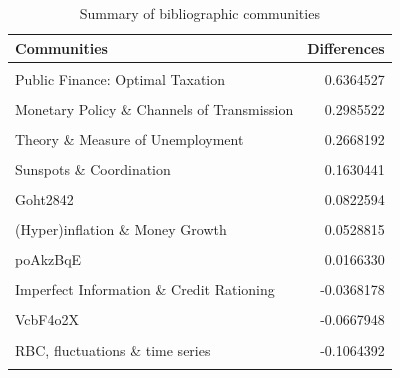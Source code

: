 \documentclass[]{elsarticle} %
\begin{document}
\begin{table}[!h]

\caption{\label{tab:summary-communities}Summary of bibliographic communities}
\centering
\fontsize{5}{7}\selectfont
\begin{threeparttable}
\begin{tabular}[t]{lr}
\toprule
Communities & Differences\\
\midrule
\cellcolor{gray!6}{Keynesian Economics, Disequilibrium, Imperfect Competition \& Contracts} & \cellcolor{gray!6}{1.4535925}\\
Public Finance: Optimal Taxation & 0.6364527\\
\cellcolor{gray!6}{Political Economy of Central Banks} & \cellcolor{gray!6}{0.3725850}\\
Monetary Policy \& Channels of Transmission & 0.2985522\\
\cellcolor{gray!6}{New Keynesian Rigidities} & \cellcolor{gray!6}{0.2672452}\\
\addlinespace
Theory \& Measure of Unemployment & 0.2668192\\
\cellcolor{gray!6}{Macro Time Series: Trends, Disturbances \& Cycles} & \cellcolor{gray!6}{0.2484878}\\
Sunspots \& Coordination & 0.1630441\\
\cellcolor{gray!6}{Exchange Rate Determination} & \cellcolor{gray!6}{0.1458576}\\
Goht2842 & 0.0822594\\
\addlinespace
\cellcolor{gray!6}{Real Business Cycles} & \cellcolor{gray!6}{0.0700440}\\
(Hyper)inflation \& Money Growth & 0.0528815\\
\cellcolor{gray!6}{l1heQmqF} & \cellcolor{gray!6}{0.0256046}\\
poAkzBqE & 0.0166330\\
\cellcolor{gray!6}{Balance of Payments, Exchange Rate \& Interdependence} & \cellcolor{gray!6}{0.0002376}\\
\addlinespace
Imperfect Information \& Credit Rationing & -0.0368178\\
\cellcolor{gray!6}{piySoCVv} & \cellcolor{gray!6}{-0.0424615}\\
VcbF4o2X & -0.0667948\\
\cellcolor{gray!6}{oZLXQ5FE} & \cellcolor{gray!6}{-0.0962882}\\
RBC, fluctuations \& time series & -0.1064392\\
\addlinespace
\cellcolor{gray!6}{Inflation, Expectations \& Interest Rates} & \cellcolor{gray!6}{-0.1072751}\\

\end{tabular}
\end{threeparttable}
\end{table}
\end{document}
